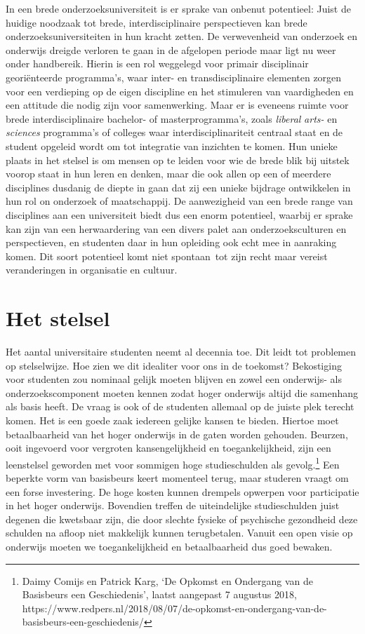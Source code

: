 \documentclass[smallauthor, chapterhaspagenum, nochapterinheader, pagenuminheader,  bigchapnum,medium2, tocpages,  garamond, titleinheader]{jote-book}
\begin{document}
	In een brede onderzoeksuniversiteit is er sprake van onbenut potentieel: Juist de huidige noodzaak tot brede, interdisciplinaire perspectieven kan brede onderzoeksuniversiteiten in hun kracht zetten. De verwevenheid van onderzoek en onderwijs dreigde verloren te gaan in de afgelopen periode maar ligt nu weer onder handbereik. Hierin is een rol weggelegd voor primair disciplinair georiënteerde programma's, waar inter- en transdisciplinaire elementen zorgen voor een verdieping op de eigen discipline en het stimuleren van vaardigheden en een attitude die nodig zijn voor samenwerking. Maar er is eveneens ruimte voor brede interdisciplinaire bachelor- of masterprogramma's, zoals \emph{liberal}\emph{ arts-} en \emph{sciences} programma's of colleges waar interdisciplinariteit centraal staat en de student opgeleid wordt om tot integratie van inzichten te komen. Hun unieke plaats in het stelsel is om mensen op te leiden voor wie de brede blik bij uitstek voorop staat in hun leren en denken, maar die ook allen op een of meerdere disciplines dusdanig de diepte in gaan dat zij een unieke bijdrage ontwikkelen in hun rol on onderzoek of maatschappij. De aanwezigheid van een brede range van disciplines aan een universiteit biedt dus een enorm potentieel, waarbij er sprake kan zijn van een herwaardering van een divers palet aan onderzoeksculturen en perspectieven, en studenten daar in hun opleiding ook echt mee in aanraking komen. Dit soort potentieel komt niet spontaan tot zijn recht maar vereist veranderingen in organisatie en cultuur.



	\section{Het stelsel}



	Het aantal universitaire studenten neemt al decennia toe. Dit leidt tot problemen op stelselwijze. Hoe zien we dit idealiter voor ons in de toekomst? Bekostiging voor studenten zou nominaal gelijk moeten blijven en zowel een onderwijs- als onderzoekscomponent moeten kennen zodat hoger onderwijs altijd die samenhang als basis heeft. De vraag is ook of de studenten allemaal op de juiste plek terecht komen. Het is een goede zaak iedereen gelijke kansen te bieden. Hiertoe moet betaalbaarheid van het hoger onderwijs in de gaten worden gehouden. Beurzen, ooit ingevoerd voor vergroten kansengelijkheid en toegankelijkheid, zijn een leenstelsel geworden met voor sommigen hoge studieschulden als gevolg.\footnote{Daimy Comijs en Patrick Karg, ‘De Opkomst en Ondergang van de Basisbeurs een Geschiedenis', laatst aangepast 7 augustus 2018, https://www.redpers.nl/2018/08/07/de-opkomst-en-ondergang-van-de-basisbeurs-een-geschiedenis/} Een beperkte vorm van basisbeurs keert momenteel terug, maar studeren vraagt om een forse investering. De hoge kosten kunnen drempels opwerpen voor participatie in het hoger onderwijs. Bovendien treffen de uiteindelijke studieschulden juist degenen die kwetsbaar zijn, die door slechte fysieke of psychische gezondheid deze schulden na afloop niet makkelijk kunnen terugbetalen. Vanuit een open visie op onderwijs moeten we toegankelijkheid en betaalbaarheid dus goed bewaken.
\end{document}
